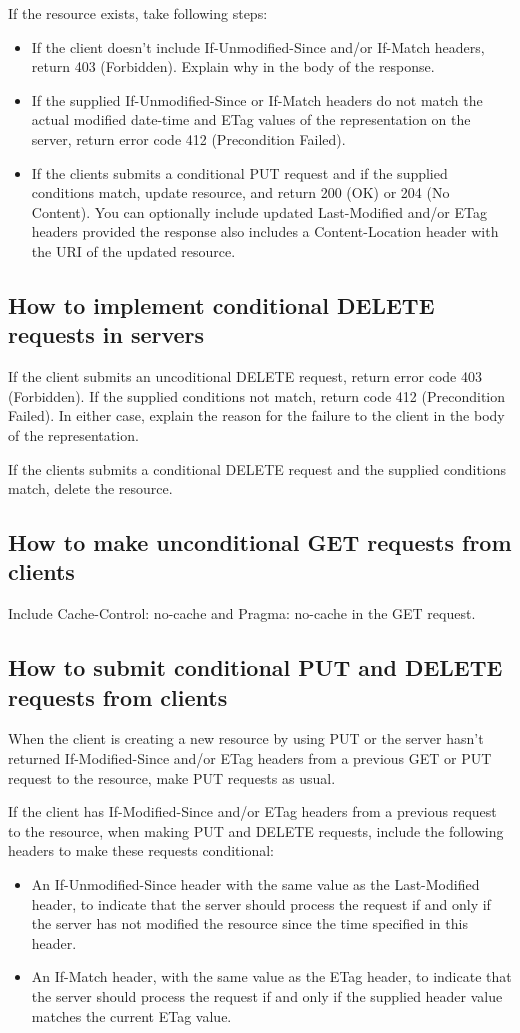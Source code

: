 \documentclass[11pt,a4paper]{article}
\begin{document}
If the resource exists, take following steps:
\begin{itemize}
	\item If the client doesn't include If-Unmodified-Since and/or If-Match headers, return 403 (Forbidden). Explain why in the body of the response.
	\item If the supplied If-Unmodified-Since or If-Match headers do not match the actual modified date-time and ETag values of the representation on the server, return error code 412 (Precondition Failed).
	\item If the clients submits a conditional PUT request and if the supplied conditions match, update resource, and return 200 (OK) or 204 (No Content). You can optionally include updated Last-Modified and/or ETag headers provided the response also includes a Content-Location header with the URI of the updated resource.
\end{itemize}

\subsection{How to implement conditional DELETE requests in servers}
If the client submits an uncoditional DELETE request, return error code 403 (Forbidden). If the supplied conditions not match, return code 412 (Precondition Failed). In either case, explain the reason for the failure to the client in the body of the representation.

If the clients submits a conditional DELETE request and the supplied conditions match, delete the resource.

\subsection{How to make unconditional GET requests from clients}
Include Cache-Control: no-cache and Pragma: no-cache in the GET request.

\subsection{How to submit conditional PUT and DELETE requests from clients}
When the client is creating a new resource by using PUT or the server hasn't returned If-Modified-Since and/or ETag headers from a previous GET or PUT request to the resource, make PUT requests as usual.

If the client has If-Modified-Since and/or ETag headers from a previous request to the resource, when making PUT and DELETE requests, include the following headers to make these requests conditional:
\begin{itemize}
	\item An If-Unmodified-Since header with the same value as the Last-Modified header, to indicate that the server should process the request if and only if the server has not modified the resource since the time specified in this header.
	\item An If-Match header, with the same value as the ETag header, to indicate that the server should process the request if and only if the supplied header value matches the current ETag value.
\end{itemize}
\end{document}
